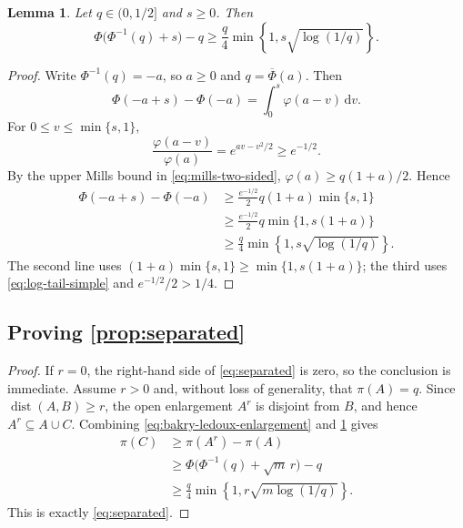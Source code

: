 \documentclass[11pt]{article}
\newtheorem{lemma}[lemma]{Lemma}
\newtheorem{remark}[remark]{Remark}
\newcommand{\1}{\mathbf 1}
\newcommand{\df}{\mathrm{d}}
\begin{document}
	\begin{lemma} \label{lem:gaussian-shift}
		Let \(q\in(0,1/2]\) and \(s\geq0\).
		Then
		\begin{equation*}
			\Phi\bigl(\Phi^{-1}(q)+s\bigr)-q
			\geq
			\frac q4
			\min\left\{1,s\sqrt{\log(1/q)}\right\}.
		\end{equation*}
	\end{lemma}
	
	\begin{proof}
		Write \(\Phi^{-1}(q)=-a\), so \(a\geq0\) and
		\(q=\overline\Phi(a)\).  Then
		\[
		\Phi(-a+s)-\Phi(-a)
		=\int_0^s\varphi(a-v)\,\df v.
		\]
		For \(0\leq v\leq\min\{s,1\}\),
		\[
		\frac{\varphi(a-v)}{\varphi(a)}
		=e^{av-v^2/2}\geq e^{-1/2}.
		\]
		By the upper Mills bound in \eqref{eq:mills-two-sided},
		\(\varphi(a)\geq q(1+a)/2\).  Hence
		\[
		\begin{aligned}
			\Phi(-a+s)-\Phi(-a)
			&\geq
			\frac{e^{-1/2}}2q(1+a)\min\{s,1\}\\
			&\geq
			\frac{e^{-1/2}}2q
			\min\{1,s(1+a)\}\\
			&\geq
			\frac q4
			\min\left\{1,s\sqrt{\log(1/q)}\right\}.
		\end{aligned}
		\]
		The second line uses
		\((1+a)\min\{s,1\}\geq\min\{1,s(1+a)\}\); the third uses
		\eqref{eq:log-tail-simple} and \(e^{-1/2}/2>1/4\).
	\end{proof}
	
	
	\subsection{Proving \cref{prop:separated}}
	
	\begin{proof}
		If \(r=0\), the right-hand side of \eqref{eq:separated} is zero, so the
		conclusion is immediate.  Assume \(r>0\) and,
		without loss of generality, that \(\pi(A)=q\).  Since
		\(\operatorname{dist}(A,B)\geq r\), the open enlargement \(A^r\) is
		disjoint from \(B\), and hence \(A^r\subseteq A\cup C\).  Combining
		\eqref{eq:bakry-ledoux-enlargement} and \cref{lem:gaussian-shift} gives
		\[
		\begin{aligned}
			\pi(C)
			&\geq\pi(A^r)-\pi(A)\\
			&\geq\Phi\bigl(\Phi^{-1}(q)+\sqrt{m}\,r\bigr)-q\\
			&\geq\frac q4
			\min\left\{1,r\sqrt{m\log(1/q)}\right\}.
		\end{aligned}
		\]
		This is exactly \eqref{eq:separated}.
	\end{proof}
	
\end{document}

